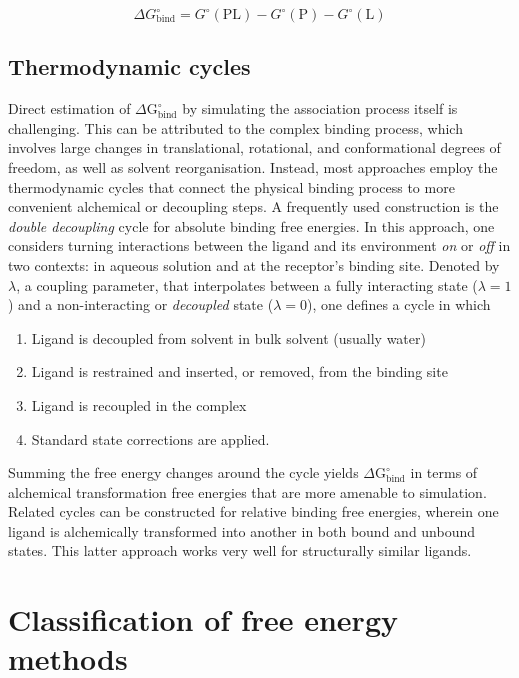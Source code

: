 \documentclass[12pt]{article}
\begin{document}
\begin{equation}
\Delta G^\circ_\mathrm{bind} 
= G^\circ(\mathrm{PL}) - G^\circ(\mathrm{P}) - G^\circ(\mathrm{L})
\label{eq:stdG} 
\end{equation}


\subsection{Thermodynamic cycles}

Direct estimation of $\Delta \textrm{G}^\circ_\textrm{bind}$  by simulating the association process itself is challenging. This can be attributed to the complex binding process, which involves large changes in translational, rotational, and conformational degrees of freedom, as well as solvent reorganisation. 
Instead, most approaches employ the thermodynamic cycles that connect the physical binding process to more convenient alchemical or decoupling steps. A frequently used construction is the \emph{double decoupling} cycle for absolute binding free energies\cite{CH10_gilson1997calculation,CH10_deng2009abfe}. 
In this approach, one considers turning interactions between the ligand and its environment \emph{on} or \emph{off} in two contexts: in aqueous solution and at the receptor's binding site. 
Denoted by $\lambda$, a coupling parameter, that interpolates between a fully interacting state ($\lambda = \textrm{1}$) and a non-interacting or \emph{decoupled} state ($\lambda = \textrm{0}$), one defines a cycle in which

\begin{enumerate}
  \item Ligand is decoupled from solvent in bulk solvent (usually water)
  \item Ligand is restrained and inserted, or removed, from the binding site
  \item Ligand is recoupled in the complex
  \item Standard state corrections are applied. 
\end{enumerate}

Summing the free energy changes around the cycle yields $\Delta \textrm{G}^\circ_\textrm{bind}$ in terms of alchemical transformation free energies that are more amenable to simulation. Related cycles can be constructed for relative binding free energies, wherein one ligand is alchemically transformed into another in both bound and unbound states. This latter approach works very well for structurally similar ligands.

\section{Classification of free energy methods}
\end{document}
